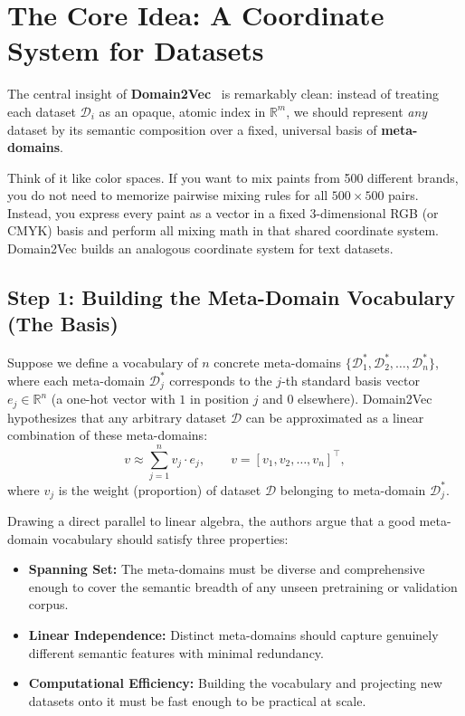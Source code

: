 \documentclass[12pt]{article}
\begin{document}
\section*{The Core Idea: A Coordinate System for Datasets}

The central insight of \textbf{Domain2Vec}~\cite{zhang2025domain2vec} is remarkably clean: instead of treating each dataset $\mathcal{D}_i$ as an opaque, atomic index in $\mathbb{R}^m$, we should represent \emph{any} dataset by its semantic composition over a fixed, universal basis of \textbf{meta-domains}.

Think of it like color spaces. If you want to mix paints from 500 different brands, you do not need to memorize pairwise mixing rules for all $500 \times 500$ pairs. Instead, you express every paint as a vector in a fixed 3-dimensional RGB (or CMYK) basis and perform all mixing math in that shared coordinate system. Domain2Vec builds an analogous coordinate system for text datasets.

\subsection*{Step 1: Building the Meta-Domain Vocabulary (The Basis)}

Suppose we define a vocabulary of $n$ concrete meta-domains $\{\mathcal{D}_1^*, \mathcal{D}_2^*, \dots, \mathcal{D}_n^*\}$, where each meta-domain $\mathcal{D}_j^*$ corresponds to the $j$-th standard basis vector $e_j \in \mathbb{R}^n$ (a one-hot vector with $1$ in position $j$ and $0$ elsewhere). Domain2Vec hypothesizes that any arbitrary dataset $\mathcal{D}$ can be approximated as a linear combination of these meta-domains:
\begin{equation}
v \approx \sum_{j=1}^{n} v_j \cdot e_j, \qquad v = [v_1, v_2, \dots, v_n]^\top,
\label{eq:basis}
\end{equation}
where $v_j$ is the weight (proportion) of dataset $\mathcal{D}$ belonging to meta-domain $\mathcal{D}_j^*$.

Drawing a direct parallel to linear algebra, the authors argue that a good meta-domain vocabulary should satisfy three properties:
\begin{itemize}
    \item \textbf{Spanning Set:} The meta-domains must be diverse and comprehensive enough to cover the semantic breadth of any unseen pretraining or validation corpus.
    \item \textbf{Linear Independence:} Distinct meta-domains should capture genuinely different semantic features with minimal redundancy.
    \item \textbf{Computational Efficiency:} Building the vocabulary and projecting new datasets onto it must be fast enough to be practical at scale.
\end{itemize}
\end{document}
